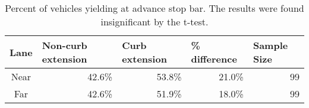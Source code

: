 \begin{table}[!htbp]
\centering
\begin{tabular}{@{}crrrr@{}}
\toprule
\multicolumn{1}{l}{Lane} & \multicolumn{1}{l}{Non-curb extension} & \multicolumn{1}{l}{Curb extension} & \multicolumn{1}{l}{\% difference} & \multicolumn{1}{l}{Sample Size} \\ \midrule
Near                     & 42.6\%                                 & 53.8\%                             & 21.0\%                            & 99                              \\
Far                      & 42.6\%                                 & 51.9\%                             & 18.0\%                            & 99                            \\
\bottomrule 
\end{tabular}
\caption{Percent of vehicles yielding at advance stop bar. The results were found insignificant by the t-test.}\label{table:motorist-stop-bar}
\end{table}